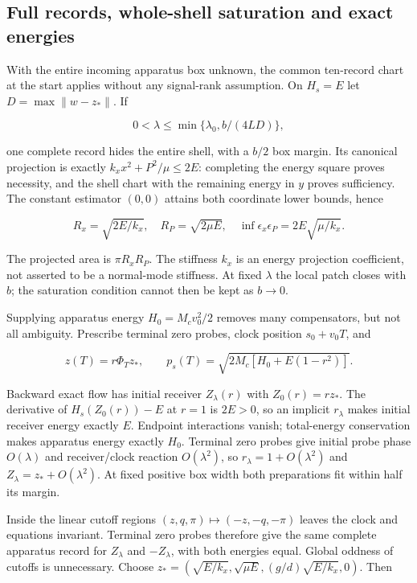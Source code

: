 \documentclass[11pt,a4paper]{article}
\begin{document}
\hypertarget{full-records-whole-shell-saturation-and-exact-energies}{%
\subsection{Full records, whole-shell saturation and exact
energies}\label{full-records-whole-shell-saturation-and-exact-energies}}

With the entire incoming apparatus box unknown, the common ten-record
chart at the start applies without any signal-rank assumption. On
\(H_s=E\) let \(D=\max\|w-z_*\|\). If

\[0<\lambda\le\min\{\lambda_0,b/(4LD)\},\]

one complete record hides the entire shell, with a \(b/2\) box margin.
Its canonical projection is exactly \(k_xx^2+P^2/\mu\le2E\): completing
the energy square proves necessity, and the shell chart with the
remaining energy in \(y\) proves sufficiency. The constant estimator
\((0,0)\) attains both coordinate lower bounds, hence

\[R_x=\sqrt{2E/k_x},\quad R_P=\sqrt{2\mu E},\quad
\inf\epsilon_x\epsilon_P=2E\sqrt{\mu/k_x}.\]

The projected area is \(\pi R_xR_P\). The stiffness \(k_x\) is an energy
projection coefficient, not asserted to be a normal-mode stiffness. At
fixed \(\lambda\) the local patch closes with \(b\); the saturation
condition cannot then be kept as \(b\to0\).

Supplying apparatus energy \(H_0=M_cv_0^2/2\) removes many compensators,
but not all ambiguity. Prescribe terminal zero probes, clock position
\(s_0+v_0T\), and

\[z(T)=r\Phi_Tz_*,\qquad
p_s(T)=\sqrt{2M_c[H_0+E(1-r^2)]}.\]

Backward exact flow has initial receiver \(Z_\lambda(r)\) with
\(Z_0(r)=rz_*\). The derivative of \(H_s(Z_0(r))-E\) at \(r=1\) is
\(2E>0\), so an implicit \(r_\lambda\) makes initial receiver energy
exactly \(E\). Endpoint interactions vanish; total-energy conservation
makes apparatus energy exactly \(H_0\). Terminal zero probes give
initial probe phase \(O(\lambda)\) and receiver/clock reaction
\(O(\lambda^2)\), so \(r_\lambda=1+O(\lambda^2)\) and
\(Z_\lambda=z_*+O(\lambda^2)\). At fixed positive box width both
preparations fit within half its margin.

Inside the linear cutoff regions \((z,q,\pi)\mapsto(-z,-q,-\pi)\) leaves
the clock and equations invariant. Terminal zero probes therefore give
the same complete apparatus record for \(Z_\lambda\) and \(-Z_\lambda\),
with both energies equal. Global oddness of cutoffs is unnecessary.
Choose \(z_*=(\sqrt{E/k_x},\sqrt{\mu E},(g/d)\sqrt{E/k_x},0)\). Then
\end{document}
